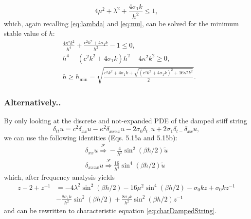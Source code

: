 \documentclass{article}
\begin{document}
\begin{equation}
    4\mu^2 + \lambda^2 + \frac{4\sigma_1k}{h^2} \leq 1,
\end{equation}
which, again recalling \eqref{eq:lambda} and \eqref{eq:mu}, can be solved for the minimum stable value of $h$:
\begin{equation}
    \begin{aligned}
        &\frac{4\kappa^2k^2}{h^4}+\frac{c^2k^2+4\sigma_1k}{h^2} - 1 \leq 0,\\
        &h^4 - (c^2k^2+4\sigma_1k)h^2 - 4\kappa^2k^2 \geq 0,\\
        &h\geq h_\text{min} = \sqrt{\frac{c^2k^2+4\sigma_1k+\sqrt{(c^2k^2+4\sigma_1k)^2+16\kappa^2k^2}}{2}}.
    \end{aligned}
\end{equation}
\subsubsection{Alternatively..}
By only looking at the discrete and not-expanded PDE of the damped stiff string
\begin{equation}\label{eq:dampedStiffStringFDS}
    \delta_{tt}u=c^2\delta_{xx}u-\kappa^2\delta_{xxxx}u-2\sigma_0\delta_{t\cdot}u+2\sigma_1\delta_{t-}\delta_{xx}u,
\end{equation}
we can use the following identities (Eqs. 5.15a and 5.15b):
\begin{subequations}\label{eq:fourierIdentities}
\begin{align}
    \delta_{xx}u \overset{\mathcal{F}}{\Longrightarrow} -\frac{4}{h^2}\sin^2(\beta h/2)\tilde{u}\\
    \delta_{xxxx}u \overset{\mathcal{F}}{\Longrightarrow} \frac{16}{h^4}\sin^4(\beta h/2)\tilde{u}
\end{align}
\end{subequations}
which, after frequency analysis yields
\begin{equation}
\begin{aligned}
    z - 2 + z^{-1} &= -4\lambda^2\sin^2(\beta h/2) - 16\mu^2\sin^4(\beta h/2) - \sigma_0kz + \sigma_0k z^{-1} \\
    &- \frac{8 \sigma_1 k}{h^2}\sin^2(\beta h/2) + \frac{8 \sigma_1 k}{h^2} \sin^2(\beta h/2)z^{-1}
    \end{aligned}
\end{equation}
and can be rewritten to characteristic equation \eqref{eq:charDampedString}.
\end{document}
